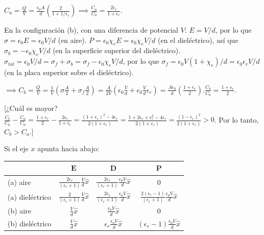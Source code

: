 \documentclass[12pt,a4paper]{report}
\newcommand{\esp}{\vspace{0.5cm}}
\begin{document}
	\esp
	
	$C_a = \frac{Q}{V} = \frac{\epsilon_0 A}{d} \left( \frac{2}{1+1/\epsilon_r} \right) \implies \boxed{\frac{C_a}{C_0} = \frac{2\epsilon_r}{1 + \epsilon_r}.}$
	
	\esp
	
	En la configuración (b), con una diferencia de potencial $V$: $E = V/d$, por lo que $\sigma = \epsilon_0 E = \epsilon_0 V/d$ (en aire).
	$P = \epsilon_0 \chi_e E = \epsilon_0 \chi_e V/d$ (en el dieléctrico), así que $\sigma_b = -\epsilon_0 \chi_e V/d$ (en la superficie superior del dieléctrico).
	$\sigma_{tot} = \epsilon_0 V/d = \sigma_f + \sigma_b = \sigma_f - \epsilon_0 \chi_e V/d$, por lo que $\sigma_f = \epsilon_0 V(1 + \chi_e)/d = \epsilon_0 \epsilon_r V/d$ (en la placa superior sobre el dieléctrico).
	
	\esp
	
	$\implies C_b = \frac{Q}{V} = \frac{1}{V} \left( \sigma \frac{A}{2} + \sigma_f \frac{A}{2} \right) = \frac{A}{2V} \left( \epsilon_0 \frac{V}{d} + \epsilon_0 \frac{V}{d} \epsilon_r \right) = \frac{A \epsilon_0}{d} \left( \frac{1 + \epsilon_r}{2} \right). \boxed{\frac{C_b}{C_0} = \frac{1 + \epsilon_r}{2}.}$
	
	\esp
	
	[¿Cuál es mayor? $\frac{C_b}{C_0} - \frac{C_a}{C_0} = \frac{1+\epsilon_r}{2} - \frac{2\epsilon_r}{1+\epsilon_r} = \frac{(1+\epsilon_r)^2-4\epsilon_r}{2(1+\epsilon_r)} = \frac{1+2\epsilon_r+\epsilon_r^2-4\epsilon_r}{2(1+\epsilon_r)} = \frac{(1-\epsilon_r)^2}{2(1+\epsilon_r)} > 0$. Por lo tanto, $C_b > C_a$.]
	
	\esp
	
	Si el eje $x$ apunta hacia abajo:
	
	\esp
	
	\begin{tabular}{|l||c|c|c|}
		\hline
		& $\mathbf{E}$ & $\mathbf{D}$ & $\mathbf{P}$ \\ \hline \hline
		(a) aire & $\frac{2\epsilon_r}{(\epsilon_r+1)} \frac{V}{d} \hat{x}$ & $\frac{2\epsilon_r}{(\epsilon_r+1)} \frac{\epsilon_0 V}{d} \hat{x}$ & 0 \\ \hline
		(a) dieléctrico & $\frac{2}{(\epsilon_r+1)} \frac{V}{d} \hat{x}$ & $\frac{2\epsilon_r}{(\epsilon_r+1)} \frac{\epsilon_0 V}{d} \hat{x}$ & $\frac{2(\epsilon_r-1)}{(\epsilon_r+1)} \frac{\epsilon_0 V}{d} \hat{x}$ \\ \hline
		(b) aire & $\frac{V}{d} \hat{x}$ & $\frac{\epsilon_0 V}{d} \hat{x}$ & 0 \\ \hline
		(b) dieléctrico & $\frac{V}{d} \hat{x}$ & $\epsilon_r \frac{\epsilon_0 V}{d} \hat{x}$ & $(\epsilon_r - 1) \frac{\epsilon_0 V}{d} \hat{x}$ \\ \hline
	\end{tabular}
	
\end{document}
